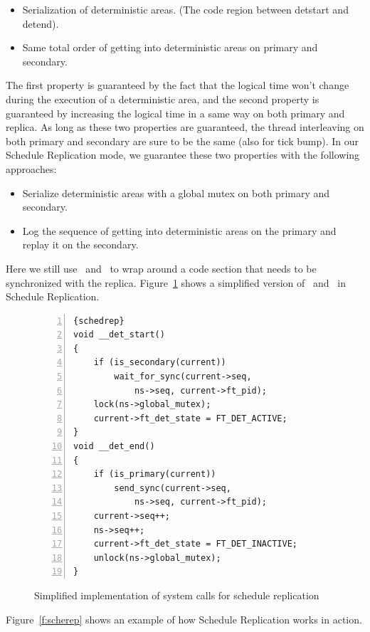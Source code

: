\begin{itemize}
\item Serialization of deterministic areas. (The code region between detstart and detend).
\item Same total order of getting into deterministic areas on primary and secondary.
\end{itemize}

The first property is guaranteed by the fact that the logical time won't change during the execution of a deterministic area, and the second property is guaranteed by increasing the logical time in a same way on both primary and replica. As long as these two properties are guaranteed, the thread interleaving on both primary and secondary are sure to be the same (also for tick bump). In our Schedule Replication mode, we guarantee these two properties with the following approaches:

\begin{itemize}
\item Serialize deterministic areas with a global mutex on both primary and secondary.
\item Log the sequence of getting into deterministic areas on the primary and replay it on the secondary.
\end{itemize}

Here we still use \detstart\ and \detend\ to wrap around a code section that needs to be synchronized with the replica. Figure~\ref{f:schedrep_c} shows a simplified version of \detstart\ and \detend\ in Schedule Replication.

\begin{figure}
\begin{lstlisting}[numbers=left, frame=single, basicstyle=\small, breaklines]{schedrep}
void __det_start()
{
    if (is_secondary(current))
        wait_for_sync(current->seq, 
            ns->seq, current->ft_pid);
    lock(ns->global_mutex);
    current->ft_det_state = FT_DET_ACTIVE;
}
void __det_end()
{
    if (is_primary(current))
        send_sync(current->seq, 
            ns->seq, current->ft_pid);
    current->seq++;
    ns->seq++;
    current->ft_det_state = FT_DET_INACTIVE;
    unlock(ns->global_mutex);
}
\end{lstlisting}
\caption{Simplified implementation of system calls for schedule replication}
\label{f:schedrep_c}
\end{figure}

Figure~\ref{f:scherep} shows an example of how Schedule Replication works in action.

